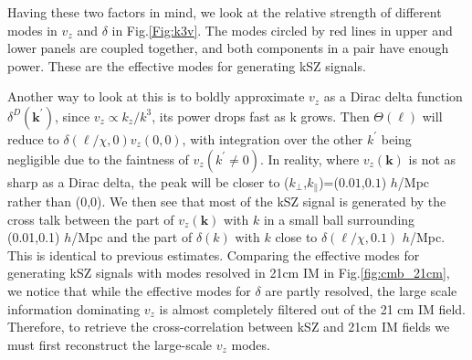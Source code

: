 Having these two factors in mind, 
we look at the relative strength of 
different modes in $v_z$ and $\delta$ in Fig.\ref{Fig:k3v}. 
The modes circled by red lines in upper and lower panels are coupled together, 
and both components in a pair have enough power. 
These are the effective modes for generating kSZ signals. 

Another way to look at this is to 
boldly approximate $v_z$ as a Dirac delta function $\delta^D(\bm{k}^\prime)$,  
since $v_z \propto k_z/k^3$, its power drops fast as k grows.  
Then $\Theta(\bm{\ell})$ will reduce to $\delta(\bm{\ell}/\chi,0) v_z(0,0)$, with integration over the other $k^\prime$ being negligible due to the faintness of $v_z(k^\prime\neq0)$. In reality, where $v_z(\bm{k})$ is not as sharp as a Dirac delta, the peak will be closer to ($k_\perp$,$k_\parallel$)=($0.01$,$0.1$) $h$/Mpc rather than (0,0). We then see  
that most of the kSZ signal is generated by the cross talk between the part of $v_z(\bm{k})$ with $k$ in a small ball surrounding (0.01,0.1) $h$/Mpc and the part of $\delta(k)$ with $k$ close to $\delta(\bm{\ell}/\chi,0.1)$ $h$/Mpc. 
This is identical to previous estimates. 
Comparing the effective modes for generating kSZ signals with 
modes resolved in 21cm IM in Fig.\ref{fig:cmb_21cm}, 
we notice that while the effective modes for $\delta$ are partly resolved, the large scale information dominating $v_z$ is almost completely filtered out of the 21 cm IM field. Therefore, to retrieve the cross-correlation between kSZ and 21cm IM fields we must first reconstruct the large-scale $v_z$ modes.
